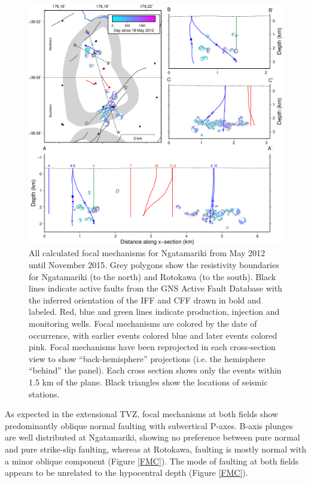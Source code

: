 \begin{figure}[h!]
\begin{center}
\includegraphics[width=1.00\columnwidth]{Chapter_5_FMs/figures/merc_Nga_GC_focmecs/merc_Nga_GC_focmecs}
\caption[Ngatamariki focal mechanism solutions]{{
All calculated focal mechanisms for Ngatamariki from May 2012 until
November 2015. Grey polygons show the resistivity boundaries for
Ngatamariki (to the north) and Rotokawa (to the south). Black lines
indicate active faults from the GNS Active Fault Database \citep{AFDB} with the inferred orientation of the \acrshort{IFF} and \acrshort{CFF} drawn in bold and labeled. Red, blue and green lines indicate production, injection and monitoring wells. Focal mechanisms are colored by the
date of occurrence, with earlier events colored blue and later events
colored pink. Focal mechanisms have been reprojected in each
cross-section view to show ``back-hemisphere'' projections (i.e. the
hemisphere ``behind'' the panel). Each cross section shows only the
events within 1.5 km of the plane. Black triangles show the locations of
seismic stations.
{\label{542095}}%
}}
\end{center}
\end{figure}

As expected in the extensional TVZ, focal mechanisms at both fields show predominantly oblique normal faulting with subvertical P-axes. B-axis plunges are well distributed at Ngatamariki, showing no preference between pure normal and pure strike-slip faulting, whereas at Rotokawa, faulting is mostly normal with a minor oblique component (Figure \ref{FMC}). The mode of faulting at both fields appears to be unrelated to the hypocentral depth (Figure \ref{FMC}). 

